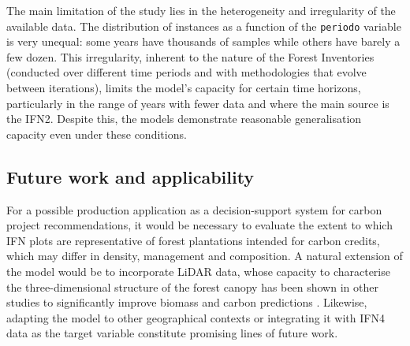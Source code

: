 The main limitation of the study lies in the heterogeneity and irregularity of the available data. The distribution of instances as a function of the \texttt{periodo} variable is very unequal: some years have thousands of samples while others have barely a few dozen. This irregularity, inherent to the nature of the Forest Inventories (conducted over different time periods and with methodologies that evolve between iterations), limits the model's capacity for certain time horizons, particularly in the range of years with fewer data and where the main source is the IFN2. Despite this, the models demonstrate reasonable generalisation capacity even under these conditions.

\subsection*{Future work and applicability}

For a possible production application as a decision-support system for carbon project recommendations, it would be necessary to evaluate the extent to which IFN plots are representative of forest plantations intended for carbon credits, which may differ in density, management and composition. A natural extension of the model would be to incorporate LiDAR data, whose capacity to characterise the three-dimensional structure of the forest canopy has been shown in other studies to significantly improve biomass and carbon predictions \citep{nyakudanga_treemes}. Likewise, adapting the model to other geographical contexts or integrating it with IFN4 data as the target variable constitute promising lines of future work.
